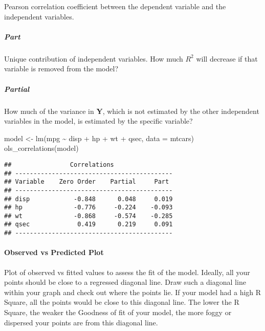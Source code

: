 \documentclass[
]{article}
\newenvironment{Shaded}{\begin{snugshade}}{\end{snugshade}}
\newcommand{\AttributeTok}[1]{\textcolor[rgb]{0.77,0.63,0.00}{#1}}
\newcommand{\FunctionTok}[1]{\textcolor[rgb]{0.00,0.00,0.00}{#1}}
\newcommand{\NormalTok}[1]{#1}
\newcommand{\OtherTok}[1]{\textcolor[rgb]{0.56,0.35,0.01}{#1}}
\newcommand{\SpecialCharTok}[1]{\textcolor[rgb]{0.00,0.00,0.00}{#1}}
\begin{document}
Pearson correlation coefficient between the dependent variable and the
independent variables.

\hypertarget{part}{%
\subparagraph{Part}\label{part}}

Unique contribution of independent variables. How much \(R^{2}\) will
decrease if that variable is removed from the model?

\hypertarget{partial}{%
\subparagraph{Partial}\label{partial}}

How much of the variance in \textbf{Y}, which is not estimated by the
other independent variables in the model, is estimated by the specific
variable?

\begin{Shaded}
\begin{Highlighting}[]
\NormalTok{model }\OtherTok{\textless{}{-}} \FunctionTok{lm}\NormalTok{(mpg }\SpecialCharTok{\textasciitilde{}}\NormalTok{ disp }\SpecialCharTok{+}\NormalTok{ hp }\SpecialCharTok{+}\NormalTok{ wt }\SpecialCharTok{+}\NormalTok{ qsec, }\AttributeTok{data =}\NormalTok{ mtcars)}
\FunctionTok{ols\_correlations}\NormalTok{(model)}
\end{Highlighting}
\end{Shaded}

\begin{verbatim}
##                Correlations                 
## -------------------------------------------
## Variable    Zero Order    Partial     Part  
## -------------------------------------------
## disp            -0.848      0.048     0.019 
## hp              -0.776     -0.224    -0.093 
## wt              -0.868     -0.574    -0.285 
## qsec             0.419      0.219     0.091 
## -------------------------------------------
\end{verbatim}

\hypertarget{observed-vs-predicted-plot}{%
\paragraph{Observed vs Predicted
Plot}\label{observed-vs-predicted-plot}}

Plot of observed vs fitted values to assess the fit of the model.
Ideally, all your points should be close to a regressed diagonal line.
Draw such a diagonal line within your graph and check out where the
points lie. If your model had a high R Square, all the points would be
close to this diagonal line. The lower the R Square, the weaker the
Goodness of fit of your model, the more foggy or dispersed your points
are from this diagonal line.
\end{document}
